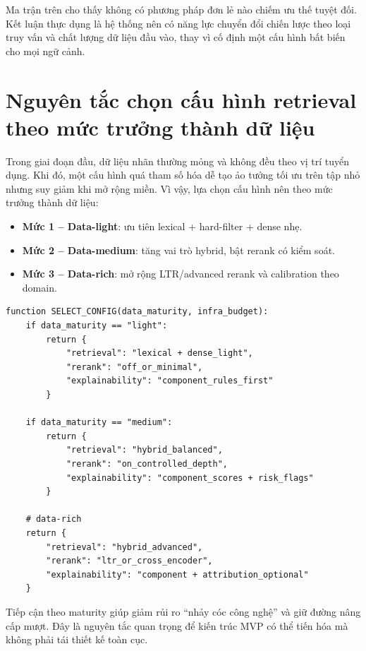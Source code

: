 Ma trận trên cho thấy không có phương pháp đơn lẻ nào chiếm ưu thế tuyệt đối. Kết luận thực dụng là hệ thống nên có năng lực chuyển đổi chiến lược theo loại truy vấn và chất lượng dữ liệu đầu vào, thay vì cố định một cấu hình bất biến cho mọi ngữ cảnh.

\section{Nguyên tắc chọn cấu hình retrieval theo mức trưởng thành dữ liệu}

Trong giai đoạn đầu, dữ liệu nhãn thường mỏng và không đều theo vị trí tuyển dụng. Khi đó, một cấu hình quá tham số hóa dễ tạo ảo tưởng tối ưu trên tập nhỏ nhưng suy giảm khi mở rộng miền. Vì vậy, lựa chọn cấu hình nên theo mức trưởng thành dữ liệu:

\begin{itemize}
  \item \textbf{Mức 1 -- Data-light}: ưu tiên lexical + hard-filter + dense nhẹ.
  \item \textbf{Mức 2 -- Data-medium}: tăng vai trò hybrid, bật rerank có kiểm soát.
  \item \textbf{Mức 3 -- Data-rich}: mở rộng LTR/advanced rerank và calibration theo domain.
\end{itemize}

\begin{lstlisting}[language={},caption={Pseudo-code chọn cấu hình retrieval theo maturity dữ liệu},label={lst:maturity-driven-config}]
function SELECT_CONFIG(data_maturity, infra_budget):
    if data_maturity == "light":
        return {
            "retrieval": "lexical + dense_light",
            "rerank": "off_or_minimal",
            "explainability": "component_rules_first"
        }

    if data_maturity == "medium":
        return {
            "retrieval": "hybrid_balanced",
            "rerank": "on_controlled_depth",
            "explainability": "component_scores + risk_flags"
        }

    # data-rich
    return {
        "retrieval": "hybrid_advanced",
        "rerank": "ltr_or_cross_encoder",
        "explainability": "component + attribution_optional"
    }
\end{lstlisting}

Tiếp cận theo maturity giúp giảm rủi ro “nhảy cóc công nghệ” và giữ đường nâng cấp mượt. Đây là nguyên tắc quan trọng để kiến trúc MVP có thể tiến hóa mà không phải tái thiết kế toàn cục.

